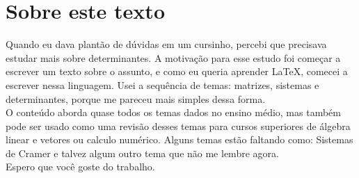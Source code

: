 \documentclass[10pt, a4paper, onecolumn, final]{article}
\begin{document}
\section*{Sobre este texto}
Quando eu dava plantão de dúvidas em um cursinho, percebi que precisava estudar mais sobre determinantes. A motivação para esse estudo foi começar a escrever um texto sobre o assunto, e como eu queria aprender \LaTeX, comecei a escrever nessa linguagem. Usei a sequência de temas: matrizes, sistemas e determinantes, porque me pareceu mais simples dessa forma.\\
O conteúdo aborda quase todos os temas dados no ensino médio, mas também pode ser usado como uma revisão desses temas para cursos superiores de álgebra linear e vetores ou calculo numérico. Alguns temas estão faltando como: Sistemas de Cramer e talvez algum outro tema que não me lembre agora.\\
Espero que você goste do trabalho.
\newpage
\hangindent=0.0cm





\end{document}
